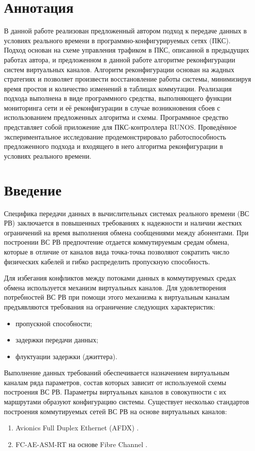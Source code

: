 \documentclass[12pt, a4paper]{article}
\begin{document}
\section*{Аннотация}
В данной работе реализован предложенный автором подход к передаче данных в условиях реального времени в программно-конфигурируемых сетях (ПКС). Подход основан на схеме управления трафиком в ПКС, описанной в предыдущих работах автора, и предложенном в данной работе алгоритме реконфигурации систем виртуальных каналов. Алгоритм реконфигурации основан на жадных стратегиях и позволяет произвести восстановление работы системы, минимизируя время простоя и количество изменений в таблицах коммутации. Реализация подхода выполнена в виде программного средства, выполняющего функции мониторинга сети и её реконфигурации в случае возникновения сбоев с использованием предложенных алгоритма и схемы. Программное средство представляет собой приложение для ПКС-контроллера RUNOS. Проведённое экспериментальное исследование продемонстрировало работоспособность предложенного подхода и входящего в него алгоритма реконфигурации в условиях реального времени.

\renewcommand{\contentsname}{Содержание}
\tableofcontents

\section*{Введение}
Специфика передачи данных в вычислительных системах реального времени (ВС РВ) заключается в повышенных требованиях к надежности и наличии жестких ограничений на время выполнения обмена сообщениями между абонентами. При построении ВС РВ предпочтение отдается коммутируемым средам обмена, которые в отличие от каналов вида точка-точка позволяют сократить число физических кабелей и гибко распределить пропускную способность.

Для избегания конфликтов между потоками данных в коммутируемых средах обмена используется механизм виртуальных каналов. Для удовлетворения потребностей ВС РВ при помощи этого механизма к виртуальным каналам предъявляются требования на ограничение следующих характеристик:
\begin{itemize}
	\item пропускной способности;
	\item задержки передачи данных;
	\item флуктуации задержки (джиттера).
\end{itemize}

Выполнение данных требований обеспечивается назначением виртуальным каналам ряда параметров, состав которых зависит от используемой схемы построения ВС РВ. Параметры виртуальных каналов в совокупности с их маршрутами образуют конфигурацию системы. Существует несколько стандартов построения коммутируемых сетей ВС РВ на основе виртуальных каналов:
\begin{enumerate}
	\item Avionics Full Duplex Ethernet (AFDX) \cite{afdx}.
	\item FC-AE-ASM-RT на основе Fibre Channel \cite{fcaert}.
\end{enumerate}
\end{document}

